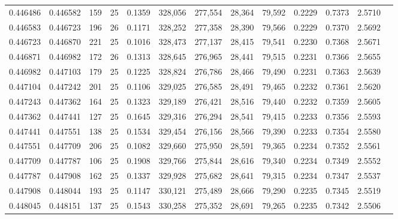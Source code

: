 \begin{tabular}{rrrrrrrrrrrrr}
0.446486 & 0.446582 &   159 &  25 &                                     0.1359 & 328,056 & 277,554 &  28,364 &  79,592 & 0.2229 & 0.7373 & 2.5710 \\
0.446583 & 0.446723 &   196 &  26 &                                     0.1171 & 328,252 & 277,358 &  28,390 &  79,566 & 0.2229 & 0.7370 & 2.5692 \\
0.446723 & 0.446870 &   221 &  25 &                                     0.1016 & 328,473 & 277,137 &  28,415 &  79,541 & 0.2230 & 0.7368 & 2.5671 \\
0.446871 & 0.446982 &   172 &  26 &                                     0.1313 & 328,645 & 276,965 &  28,441 &  79,515 & 0.2231 & 0.7366 & 2.5655 \\
0.446982 & 0.447103 &   179 &  25 &                                     0.1225 & 328,824 & 276,786 &  28,466 &  79,490 & 0.2231 & 0.7363 & 2.5639 \\
0.447104 & 0.447242 &   201 &  25 &                                     0.1106 & 329,025 & 276,585 &  28,491 &  79,465 & 0.2232 & 0.7361 & 2.5620 \\
0.447243 & 0.447362 &   164 &  25 &                                     0.1323 & 329,189 & 276,421 &  28,516 &  79,440 & 0.2232 & 0.7359 & 2.5605 \\
0.447362 & 0.447441 &   127 &  25 &                                     0.1645 & 329,316 & 276,294 &  28,541 &  79,415 & 0.2233 & 0.7356 & 2.5593 \\
0.447441 & 0.447551 &   138 &  25 &                                     0.1534 & 329,454 & 276,156 &  28,566 &  79,390 & 0.2233 & 0.7354 & 2.5580 \\
0.447551 & 0.447709 &   206 &  25 &                                     0.1082 & 329,660 & 275,950 &  28,591 &  79,365 & 0.2234 & 0.7352 & 2.5561 \\
0.447709 & 0.447787 &   106 &  25 &                                     0.1908 & 329,766 & 275,844 &  28,616 &  79,340 & 0.2234 & 0.7349 & 2.5552 \\
0.447787 & 0.447908 &   162 &  25 &                                     0.1337 & 329,928 & 275,682 &  28,641 &  79,315 & 0.2234 & 0.7347 & 2.5537 \\
0.447908 & 0.448044 &   193 &  25 &                                     0.1147 & 330,121 & 275,489 &  28,666 &  79,290 & 0.2235 & 0.7345 & 2.5519 \\
0.448045 & 0.448151 &   137 &  25 &                                     0.1543 & 330,258 & 275,352 &  28,691 &  79,265 & 0.2235 & 0.7342 & 2.5506 \\

\end{tabular}
